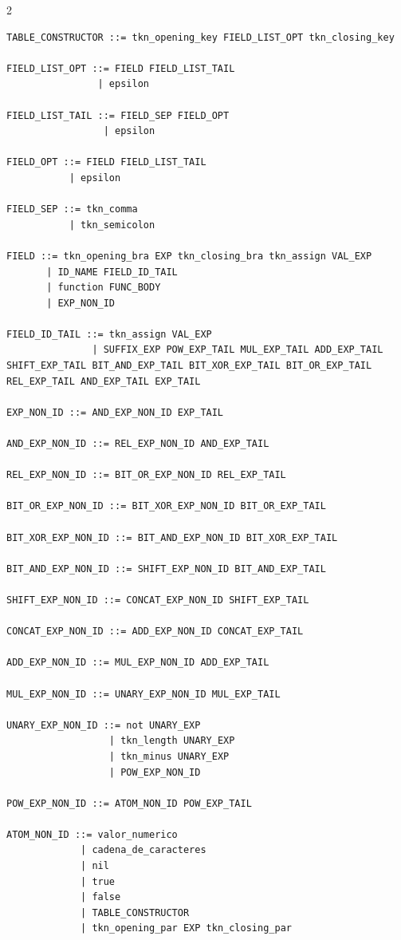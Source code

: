 \documentclass[10pt,letterpaper]{article}
\begin{document}
\begin{multicols}{2}
\begin{lstlisting}[style=grammarstyle]
TABLE_CONSTRUCTOR ::= tkn_opening_key FIELD_LIST_OPT tkn_closing_key

FIELD_LIST_OPT ::= FIELD FIELD_LIST_TAIL
                | epsilon

FIELD_LIST_TAIL ::= FIELD_SEP FIELD_OPT
                 | epsilon

FIELD_OPT ::= FIELD FIELD_LIST_TAIL
           | epsilon

FIELD_SEP ::= tkn_comma
           | tkn_semicolon

FIELD ::= tkn_opening_bra EXP tkn_closing_bra tkn_assign VAL_EXP
       | ID_NAME FIELD_ID_TAIL
       | function FUNC_BODY
       | EXP_NON_ID

FIELD_ID_TAIL ::= tkn_assign VAL_EXP
               | SUFFIX_EXP POW_EXP_TAIL MUL_EXP_TAIL ADD_EXP_TAIL SHIFT_EXP_TAIL BIT_AND_EXP_TAIL BIT_XOR_EXP_TAIL BIT_OR_EXP_TAIL REL_EXP_TAIL AND_EXP_TAIL EXP_TAIL

EXP_NON_ID ::= AND_EXP_NON_ID EXP_TAIL

AND_EXP_NON_ID ::= REL_EXP_NON_ID AND_EXP_TAIL

REL_EXP_NON_ID ::= BIT_OR_EXP_NON_ID REL_EXP_TAIL

BIT_OR_EXP_NON_ID ::= BIT_XOR_EXP_NON_ID BIT_OR_EXP_TAIL

BIT_XOR_EXP_NON_ID ::= BIT_AND_EXP_NON_ID BIT_XOR_EXP_TAIL

BIT_AND_EXP_NON_ID ::= SHIFT_EXP_NON_ID BIT_AND_EXP_TAIL

SHIFT_EXP_NON_ID ::= CONCAT_EXP_NON_ID SHIFT_EXP_TAIL

CONCAT_EXP_NON_ID ::= ADD_EXP_NON_ID CONCAT_EXP_TAIL

ADD_EXP_NON_ID ::= MUL_EXP_NON_ID ADD_EXP_TAIL

MUL_EXP_NON_ID ::= UNARY_EXP_NON_ID MUL_EXP_TAIL

UNARY_EXP_NON_ID ::= not UNARY_EXP
                  | tkn_length UNARY_EXP
                  | tkn_minus UNARY_EXP
                  | POW_EXP_NON_ID

POW_EXP_NON_ID ::= ATOM_NON_ID POW_EXP_TAIL

ATOM_NON_ID ::= valor_numerico
             | cadena_de_caracteres
             | nil
             | true
             | false
             | TABLE_CONSTRUCTOR
             | tkn_opening_par EXP tkn_closing_par
\end{lstlisting}
\end{multicols}

\vspace{6pt}
\end{document}
